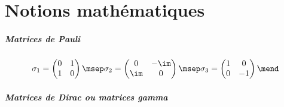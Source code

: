\chapter{Notions mathématiques}\label{annexe-maths}

\paragraph{Matrices de Pauli}

\begin{align*}
\sigma_1 = \begin{pmatrix}0&1\\1&0\end{pmatrix}
\msep
\sigma_2 = \begin{pmatrix}0&-\im\\\im&0\end{pmatrix}
\msep
\sigma_3 = \begin{pmatrix}1&0\\0&-1\end{pmatrix}
\mend
\end{align*}

\paragraph{Matrices de Dirac ou matrices gamma}

